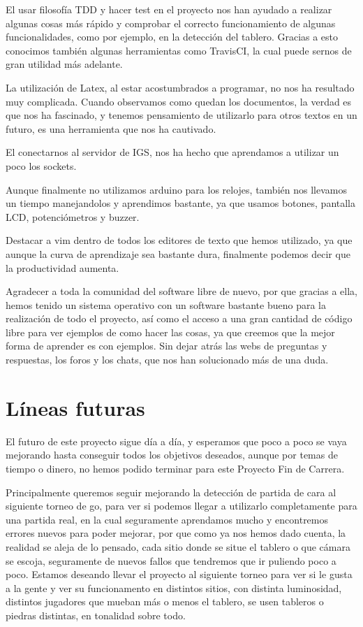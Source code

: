 \documentclass[12pt,a4paper]{report}
\begin{document}
El usar filosofía TDD y hacer test en el proyecto nos han ayudado a realizar
algunas cosas más rápido y comprobar el correcto funcionamiento de algunas
funcionalidades, como por ejemplo, en la detección del tablero. Gracias a esto
conocimos también algunas herramientas como TravisCI, la cual puede sernos de
gran utilidad más adelante. 

La utilización de Latex, al estar acostumbrados a programar, no nos ha resultado
muy complicada. Cuando observamos como quedan los documentos, la verdad es que
nos ha fascinado, y tenemos pensamiento de utilizarlo para otros textos en un
futuro, es una herramienta que nos ha cautivado.

El conectarnos al servidor de IGS, nos ha hecho que aprendamos a utilizar un
poco los sockets.

Aunque finalmente no utilizamos arduino para los relojes, también nos llevamos
un tiempo manejandolos y aprendimos bastante, ya que usamos botones, pantalla
LCD, potenciómetros y buzzer.

Destacar a vim dentro de todos los editores de texto que hemos utilizado, ya que
aunque la curva de aprendizaje sea bastante dura, finalmente podemos decir que
la productividad aumenta. 

Agradecer a toda la comunidad del software libre de nuevo, por que gracias a
ella, hemos tenido un sistema operativo con un software bastante bueno para la
realización de todo el proyecto, así como el acceso a una gran cantidad de
código libre para ver ejemplos de como hacer las cosas, ya que creemos que la
mejor forma de aprender es con ejemplos. Sin dejar atrás las webs de preguntas y
respuestas, los foros y los chats, que nos han solucionado más de una duda. 



\chapter{Líneas futuras}

El futuro de este proyecto sigue día a día, y esperamos que poco a poco se vaya
mejorando hasta conseguir todos los objetivos deseados, aunque por temas de
tiempo o dinero, no hemos podido terminar para este Proyecto Fin de Carrera. 

Principalmente queremos seguir mejorando la detección de partida de cara al
siguiente torneo de go, para ver si podemos llegar a utilizarlo completamente
para una partida real, en la cual seguramente aprendamos mucho y encontremos
errores nuevos para poder mejorar, por que como ya nos hemos dado cuenta, la
realidad se aleja de lo pensado, cada sitio donde se situe el tablero o que
cámara se escoja, seguramente de nuevos fallos que tendremos que ir puliendo
poco a poco. Estamos deseando llevar el proyecto al siguiente torneo para ver si
le gusta a la gente y ver su funcionamento en distintos sitios, con distinta
luminosidad, distintos jugadores que mueban más o menos el tablero, se usen
tableros o piedras distintas, en tonalidad sobre todo. 
\end{document}
